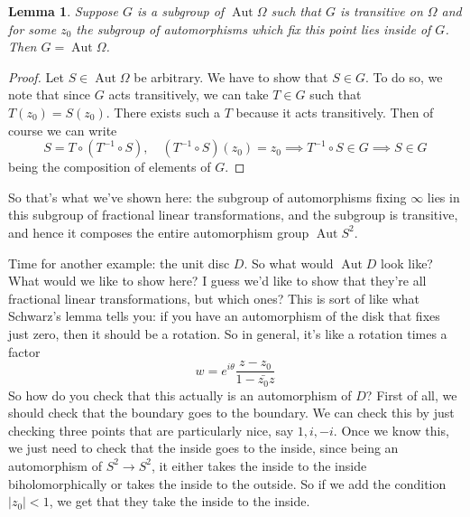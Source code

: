 \documentclass{article}
\newtheorem{lemma}{Lemma}
\DeclareMathOperator{\Aut}{Aut}
\begin{document}
\begin{lemma}
Suppose \(G\) is a subgroup of \(\Aut\Omega\) such that \(G\) is transitive on \(\Omega\) and for some \(z_0\) the subgroup of automorphisms which fix this point lies inside of \(G\). Then \(G = \Aut\Omega\).
\end{lemma}
\begin{proof}
Let \(S \in \Aut\Omega\) be arbitrary. We have to show that \(S \in G\). To do so, we note that since \(G\) acts transitively, we can take \(T \in G\) such that \(T(z_0) = S(z_0)\). There exists such a \(T\) because it acts transitively. Then of course we can write
\[S = T \circ (T^{-1} \circ S), \quad (T^{-1} \circ S)(z_0) = z_0 \implies T^{-1} \circ S \in G \implies S \in G\]
being the composition of elements of \(G\).
\end{proof}
So that's what we've shown here: the subgroup of automorphisms fixing \(\infty\) lies in this subgroup of fractional linear transformations, and the subgroup is transitive, and hence it composes the entire automorphism group \(\Aut S^2\).

Time for another example: the unit disc \(D\). So what would \(\Aut D\) look like? What would we like to show here? I guess we'd like to show that they're all fractional linear transformations, but which ones? This is sort of like what Schwarz's lemma tells you: if you have an automorphism of the disk that fixes just zero, then it should be a rotation. So in general, it's like a rotation times a factor
\[w = e^{i\theta}\frac{z - z_0}{1 - \bar{z_0}z}\]
So how do you check that this actually is an automorphism of \(D\)? First of all, we should check that the boundary goes to the boundary. We can check this by just checking three points that are particularly nice, say \(1, i, -i\). Once we know this, we just need to check that the inside goes to the inside, since being an automorphism of \(S^2 \to S^2\), it either takes the inside to the inside biholomorphically or takes the inside to the outside. So if we add the condition \(|z_0| < 1\), we get that they take the inside to the inside.
\end{document}
